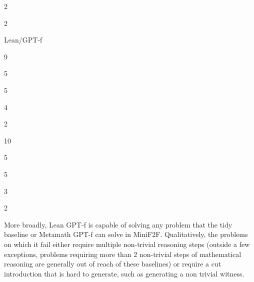 \documentclass[
]{article}
\begin{document}
2

2

Lean/GPT-f

9

5

5

4

2

10

5

5

3

2

More broadly, Lean GPT-f is capable of solving any problem that the tidy
baseline or Metamath GPT-f can solve in MiniF2F. Qualitatively, the
problems on which it fail either require multiple non-trivial reasoning
steps (outside a few exceptions, problems requiring more than 2
non-trivial steps of mathematical reasoning are generally out of reach
of these baselines) or require a cut introduction that is hard to
generate, such as generating a non trivial witness.
\end{document}
